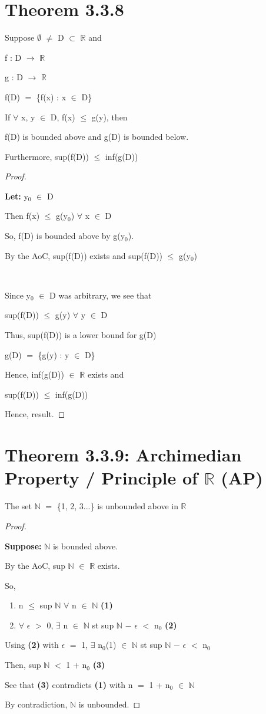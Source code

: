 \documentclass{article}
\newcommand{\mt}[1]{\ensuremath{#1}}
\newcommand\bsc[2][\DefaultOpt]{%
  \def\DefaultOpt{#2}%
  \section[#1]{#2}%
}
\newcommand{\bgpf}{\begin{proof} $ $\newline}
\newcommand{\elist}{\end{enumerate}}
\newcommand{\bilist}{\begin{enumerate}[label=\roman*)]}
\newcommand{\lt}[1]{\textbf{Let: } #1}
\newcommand{\supp}[1]{\textbf{Suppose: } #1}
\newcommand{\bpth}[1]{\textbf{(#1)}}
\newcommand{\epf}{\end{proof}}
\newcommand{\br}{\mt{\mathbb{R}} }       %
\newcommand{\bn}{\mt{\mathbb{N}} }       %
\newcommand{\ep}{\mt{\epsilon} }         %
\newcommand{\fa}{\mt{\forall} }          %
\newcommand{\mem}{\mt{\in} }
\newcommand{\exs}{\mt{\exists} }
\newcommand{\es}{\mt{\emptyset} }        %
\newcommand{\sbs}{\mt{\subset} }         %
\newcommand{\lra}{ \mt{\longrightarrow} } %
\newcommand{\eql}{\mt{=} }
\newcommand{\uw}[2]{#1\mt{_{#2}}}
\begin{document}
\bsc{Theorem 3.3.8}{

Suppose \es $\neq$ D \sbs \br and 

f : D \lra \br

g : D \lra \br

f(D) \eql \{f(x) : x \mem D\}

If \fa x, y \mem D, f(x) $\leq$ g(y), then
 
f(D) is bounded above and g(D) is bounded below.

Furthermore, sup(f(D)) $\leq$ inf(g(D))

\bgpf

\lt{\uw{y}{0} \mem D}

Then f(x) $\leq$ g(\uw{y}{0}) \fa x \mem D

So, f(D) is bounded above by g(\uw{y}{0}).

By the AoC, sup(f(D)) exists and sup(f(D)) $\leq$ g(\uw{y}{0}) \

\

Since \uw{y}{0} \mem D was arbitrary, we see that

sup(f(D)) $\leq$ g(y) \fa y \mem D

Thus, sup(f(D)) is a lower bound for g(D)

g(D) \eql \{g(y) : y \mem D\}

Hence, inf(g(D)) \mem \br exists and

sup(f(D)) $\leq$ inf(g(D))

Hence, result.

\epf
}

\bsc{Theorem 3.3.9: Archimedian Property / Principle of \br (AP)}{

The set \bn \eql \{1, 2, 3...\} is unbounded above in \br

\bgpf

\supp{\bn is bounded above.}

By the AoC, sup \bn \mem \br exists.

So,

\bilist
\item n $\leq$ sup \bn  \fa n \mem \bn \bpth{1}
\item \fa \ep $>$ 0, \exs n \mem \bn st sup \bn $-$ \ep $<$ \uw{n}{0} \bpth{2}
\elist

Using \bpth{2} with \ep \eql 1, \exs \uw{n}{0}(1) \mem \bn st sup \bn $-$ \ep $<$ \uw{n}{0}

Then, sup \bn $<$ 1 $+$ \uw{n}{0} \bpth{3}

See that \bpth{3} contradicts \bpth{1} with n \eql 1 + \uw{n}{0} \mem \bn

By contradiction, \bn is unbounded.

\epf

}
\end{document}
